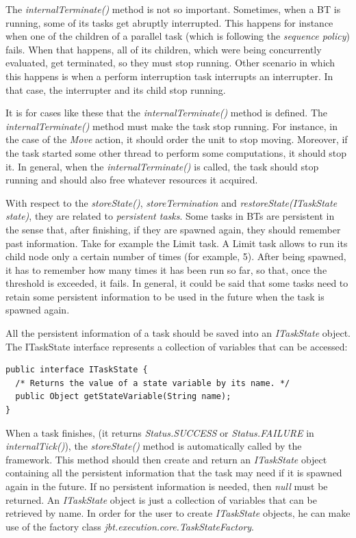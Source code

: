 \documentclass[a4paper]{article}
\begin{document}
The \textit{internalTerminate()} method is not so important. Sometimes, when a BT is running, some of its tasks get abruptly interrupted. This happens for instance when one of the children of a parallel task (which is following the \textit{sequence policy}) fails. When that happens, all of its children, which were being concurrently evaluated, get terminated, so they must stop running. Other scenario in which this happens is when a perform interruption task interrupts an interrupter. In that case, the interrupter and its child stop running.

It is for cases like these that the \textit{internalTerminate()} method is defined. The \textit{internalTerminate()} method must make the task stop running. For instance, in the case of the \textit{Move} action, it should order the unit to stop moving. Moreover, if the task started some other thread to perform some computations, it should stop it. In general, when the \textit{internalTerminate()} is called, the task should stop running and should also free whatever resources it acquired.

With respect to the \textit{storeState()}, \textit{storeTermination} and \textit{restoreState(ITaskState state)}, they are related to \textit{persistent tasks}. Some tasks in BTs are persistent in the sense that, after finishing, if they are spawned again, they should remember past information. Take for example the Limit task. A Limit task allows to run its child node only a certain number of times (for example, 5). After being spawned, it has to remember how many times it has been run so far, so that, once the threshold is exceeded, it fails. In general, it could be said that some tasks need to retain some persistent information to be used in the future when the task is spawned again.

All the persistent information of a task should be saved into an \textit{ITaskState} object. The ITaskState interface represents a collection of variables that can be accessed:

\begin{verbatim}
public interface ITaskState {
  /* Returns the value of a state variable by its name. */
  public Object getStateVariable(String name);
} 
\end{verbatim}

When a task finishes, (it returns \textit{Status.SUCCESS} or \textit{Status.FAILURE} in \textit{internalTick()}), the \textit{storeState()} method is automatically called by the framework. This method should then create and return an \textit{ITaskState} object containing all the persistent information that the task may need if it is spawned again in the future. If no persistent information is needed, then \textit{null} must be returned. An \textit{ITaskState} object is just a collection of variables that can be retrieved by name. In order for the user to create \textit{ITaskState} objects, he can make use of the factory class \textit{jbt.execution.core.TaskStateFactory}.
\end{document}
